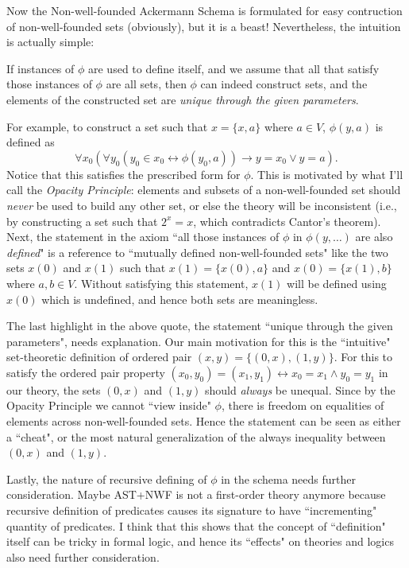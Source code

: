 \documentclass{article}
\begin{document}
Now the Non-well-founded Ackermann Schema is formulated for easy contruction of non-well-founded sets (obviously), but it is a beast! Nevertheless, the intuition is actually simple:

\begin{displayquote}
If instances of $\phi$ are used to define itself, and we assume that all that satisfy those instances of $\phi$ are all sets, then $\phi$ can indeed construct sets, and the elements of the constructed set are \textit{unique through the given parameters}.
\end{displayquote}

For example, to construct a set such that $x=\{x, a\}$ where $a \in V$, $\phi(y, a)$ is defined as $$\forall x_0 (\forall y_0 (y_0 \in x_0 \leftrightarrow \phi(y_0, a)) \rightarrow y = x_0 \vee y = a).$$ Notice that this satisfies the prescribed form for $\phi$. This is motivated by what I'll call the \textit{Opacity Principle}: elements and subsets of a non-well-founded set should \textit{never} be used to build any other set, or else the theory will be inconsistent (i.e., by constructing a set such that $2^x = x$, which contradicts Cantor's theorem). Next, the statement in the axiom ``all those instances of $\phi$ in $\phi(y, \ldots)$ are also \textit{defined}" is a reference to ``mutually defined non-well-founded sets" like the two sets $x(0)$ and $x(1)$ such that $x(1) = \{x(0), a\}$ and $x(0) = \{x(1), b\}$ where $a, b \in V$. Without satisfying this statement, $x(1)$ will be defined using $x(0)$ which is undefined, and hence both sets are meaningless.

The last highlight in the above quote, the statement ``unique through the given parameters", needs explanation. Our main motivation for this is the ``intuitive" set-theoretic definition of ordered pair $(x,y) = \{(0,x), (1, y)\}$. For this to satisfy the ordered pair property $(x_0,y_0) = (x_1, y_1) \leftrightarrow x_0 = x_1 \wedge y_0 = y_1$ in our theory, the sets $(0,x)$ and $(1,y)$ should \textit{always} be unequal. Since by the Opacity Principle we cannot ``view inside" $\phi$, there is freedom on equalities of elements across non-well-founded sets. Hence the statement can be seen as either a ``cheat", or the most natural generalization of the always inequality between $(0,x)$ and $(1,y)$.

Lastly, the nature of recursive defining of $\phi$ in the schema needs further consideration. Maybe \textsf{AST+NWF} is not a first-order theory anymore because recursive definition of predicates causes its signature to have ``incrementing" quantity of predicates. I think that this shows that the concept of ``definition" itself can be tricky in formal logic, and hence its ``effects" on theories and logics also need further consideration.



\end{document}
